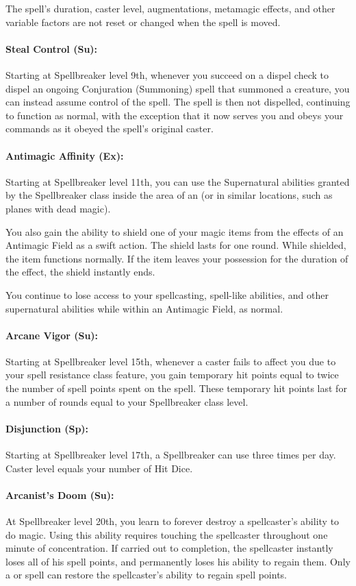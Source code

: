 The spell's duration, caster level, augmentations, metamagic effects, and other variable factors are not reset or changed when the spell is moved.
\paragraph{Steal Control (Su):} Starting at Spellbreaker level 9th, whenever you succeed on a dispel check to dispel an ongoing Conjuration (Summoning) spell that summoned a creature, you can instead assume control of the spell. The spell is then not dispelled, continuing to function as normal, with the exception that it now serves you and obeys your commands as it obeyed the spell's original caster.

\paragraph{Antimagic Affinity (Ex):} Starting at Spellbreaker level 11th, you can use the Supernatural abilities granted by the Spellbreaker class inside the area of an  (or in similar locations, such as planes with dead magic). 

You also gain the ability to shield one of your magic items from the effects of an Antimagic Field as a swift action. The shield lasts for one round. While shielded, the item functions normally. If the item leaves your possession for the duration of the effect, the shield instantly ends.

You continue to lose access to your spellcasting, spell-like abilities, and other supernatural abilities while within an Antimagic Field, as normal.
\paragraph{Arcane Vigor (Su):} Starting at Spellbreaker level 15th, whenever a caster fails to affect you due to your spell resistance class feature, you gain temporary hit points equal to twice the number of spell points spent on the spell. These temporary hit points last for a number of rounds equal to your Spellbreaker class level.

\paragraph{Disjunction (Sp):} Starting at Spellbreaker level 17th, a Spellbreaker can use  three times per day. Caster level equals your number of Hit Dice.

\paragraph{Arcanist's Doom (Su):} At Spellbreaker level 20th, you learn to forever destroy a spellcaster's ability to do magic.
Using this ability requires touching the spellcaster throughout one minute of concentration. If carried out to completion, the spellcaster instantly loses all of his spell points, and permanently loses his ability to regain them. Only a  or  spell can restore the spellcaster's ability to regain spell points.